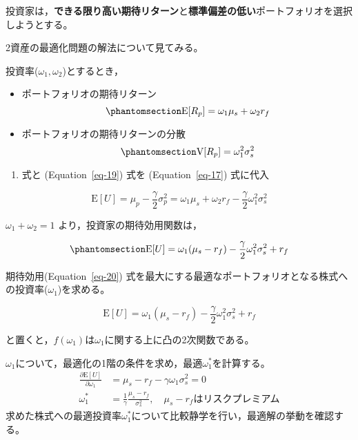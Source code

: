 \documentclass[
  letterpaper,
  pandoc,
  ja=standard,
  jafont = hiragino-pron]{ltjsbook}
\providecommand{\tightlist}{%
  \setlength{\itemsep}{0pt}\setlength{\parskip}{0pt}}\usepackage{longtable,booktabs,array}
\begin{document}
投資家は，\textbf{できる限り高い期待リターン}と\textbf{標準偏差の低い}ポートフォリオを選択しようとする。

2資産の最適化問題の解法について見てみる。

投資率(\(\omega _1, \omega_ 2\))とするとき，

\begin{itemize}
\tightlist
\item
  ポートフォリオの期待リターン
  \begin{equation}\phantomsection\label{eq-18}{
    \mathrm{E}[R_p] = \omega _1 \mu_s + \omega _2 r_f
    }\end{equation}
\item
  ポートフォリオの期待リターンの分散
  \begin{equation}\phantomsection\label{eq-19}{
    \mathrm{V}[R_p] = \omega _1^2 \sigma ^2_s
    }\end{equation}
\end{itemize}

\begin{enumerate}
\def\labelenumi{(\arabic{enumi})}
\tightlist
\item
  式と (Equation~\ref{eq-19}) 式を (Equation~\ref{eq-17}) 式に代入
\end{enumerate}

\[
\mathrm{E}[U] = \mu _p - \frac{\gamma }{2} \sigma ^2_p = \omega _1 \mu_s + \omega _2 r_f - \frac{\gamma }{2}\omega ^2_1 \sigma ^2_s
\]

\(\omega _1 + \omega _2 = 1\) より，投資家の期待効用関数は，

\begin{equation}\phantomsection\label{eq-20}{
\mathrm{E}[U] = \omega _1 ( \mu_s - r_f) -\frac{\gamma }{2} \omega _1^2 \sigma ^2_s + r_f
}\end{equation}

期待効用(Equation~\ref{eq-20})
式を最大にする最適なポートフォリオとなる株式への投資率(\(\omega _1\))を求める。

\[
\mathrm{E}[U] = \omega _1 ( \mu_s - r_f) - \frac{\gamma }{2}\omega _1^2 \sigma^2_s + r_f
\]

と置くと，\(f(\omega _1)\)は\(\omega _1\)に関する上に凸の2次関数である。

\(\omega _1\)について，最適化の1階の条件を求め，最適\(\omega _1^*\)を計算する。
\[
\begin{aligned}
\frac{\partial \mathrm{E}[U]}{\partial \omega _1} &= \mu_s -r_f - \gamma \omega _1 \sigma ^2_s =0 \\
\omega _1^* &= \frac{1}{\gamma } \frac{\mu_s - r_f}{\sigma ^2_s}, \quad \mu_s - r_f \text{はリスクプレミアム}
\end{aligned}
\]
求めた株式への最適投資率\(\omega^* _1\)について比較静学を行い，最適解の挙動を確認する。
\end{document}
